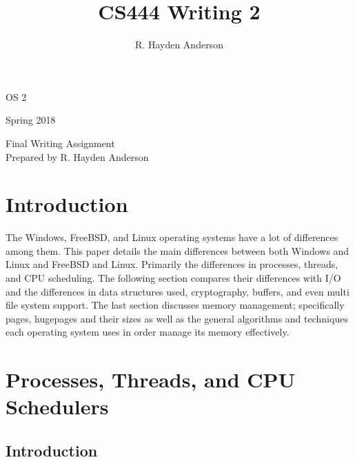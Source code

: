 \documentclass[draftclsnofoot, onecolumn, compsoc, 10pt]{IEEEtran}
\title{CS444 Writing 2}
\author{R. Hayden Anderson}
\def \AssignmentName{	Final Writing Assignment }
\def \term{Spring 2018}
\begin{document}
\begin{titlepage}
    \begin{singlespace}
        \hfill  
        \par\vspace{.2in}
        \centering
        \scshape{
            \huge OS 2 \par
            \large \term \par
            
            \vspace{1in}
            	{\huge \AssignmentName \\}
				{\large Prepared by R. Hayden Anderson}\par
            \vspace{5pt}
            \vspace{20pt}
        }
        \vfill
    \end{singlespace}
\end{titlepage}
\newpage
{}
\clearpage 
\tableofcontents
\pagebreak

\section{Introduction}
The Windows, FreeBSD, and Linux operating systems have a lot of differences among them. This paper details the main differences between both Windows and Linux and FreeBSD and Linux. Primarily the differences in processes, threads, and CPU scheduling. The following section compares their differences with I/O and the differences in data structures used, cryptography, buffers, and even multi file system support. The last section discusses memory management; specifically pages, hugepages and their sizes as well as the general algorithms and techniques each operating system uses in order manage its memory effectively. 


\section{Processes, Threads, and CPU Schedulers}
\subsection{Introduction}
\end{document}
